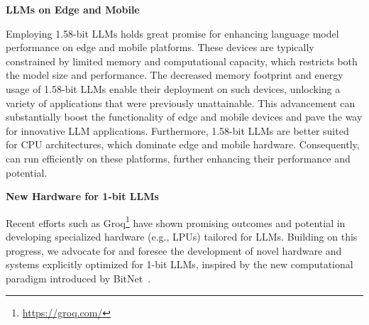 \textbf{LLMs on Edge and Mobile}

Employing 1.58-bit LLMs holds great promise for enhancing language model performance on edge and mobile platforms. These devices are typically constrained by limited memory and computational capacity, which restricts both the model size and performance. The decreased memory footprint and energy usage of 1.58-bit LLMs enable their deployment on such devices, unlocking a variety of applications that were previously unattainable. This advancement can substantially boost the functionality of edge and mobile devices and pave the way for innovative LLM applications. Furthermore, 1.58-bit LLMs are better suited for CPU architectures, which dominate edge and mobile hardware. Consequently,  can run efficiently on these platforms, further enhancing their performance and potential.

\textbf{New Hardware for 1-bit LLMs}

Recent efforts such as Groq\footnote{\url{https://groq.com/}} have shown promising outcomes and potential in developing specialized hardware (e.g., LPUs) tailored for LLMs. Building on this progress, we advocate for and foresee the development of novel hardware and systems explicitly optimized for 1-bit LLMs, inspired by the new computational paradigm introduced by BitNet~\cite{bitnet}.